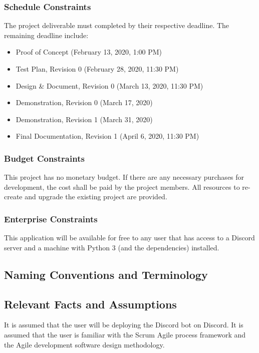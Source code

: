 \documentclass[12pt, titlepage]{article}
\begin{document}
\subsubsection{Schedule Constraints}
The project deliverable must completed by their respective deadline. The remaining deadline include:
\begin{itemize}
    \item Proof of Concept (February 13, 2020, 1:00 PM)
    \item Test Plan, Revision 0 (February 28, 2020, 11:30 PM)
    \item Design \& Document, Revision 0 (March 13, 2020, 11:30 PM)
    \item Demonstration, Revision 0 (March 17, 2020)
    \item Demonstration, Revision 1 (March 31, 2020)
    \item Final Documentation, Revision 1 (April 6, 2020, 11:30 PM)
\end{itemize}

\subsubsection{Budget Constraints}
This project has no monetary budget. If there are any necessary purchases for development, the cost shall be paid by the project members. All resources to re-create and upgrade the existing project are provided.

\subsubsection{Enterprise Constraints}
This application will be available for free to any user that has access to a Discord server and a machine with Python 3 (and the dependencies) installed.

\subsection{Naming Conventions and Terminology}

\subsection{Relevant Facts and Assumptions}

It is assumed that the user will be deploying the Discord bot on Discord. It is assumed that the user is familiar with the Scrum Agile process framework and the Agile development software design methodology.
\end{document}
